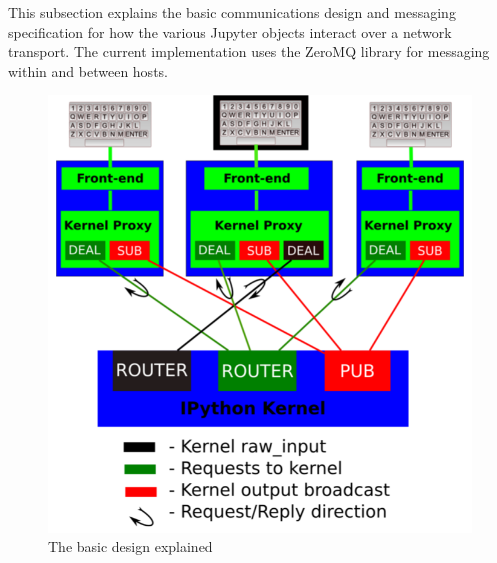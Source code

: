This subsection explains the basic communications design and messaging specification for
how the various Jupyter objects interact over a network transport.  The current
implementation uses the ZeroMQ library for messaging within and between hosts.


\begin{figure}[ht]
  \centering
  \includegraphics[width=.7\textwidth]{KernelCommunication}
  \caption{The basic design explained}\label{fig:jupyterkernel}
\end{figure} 

